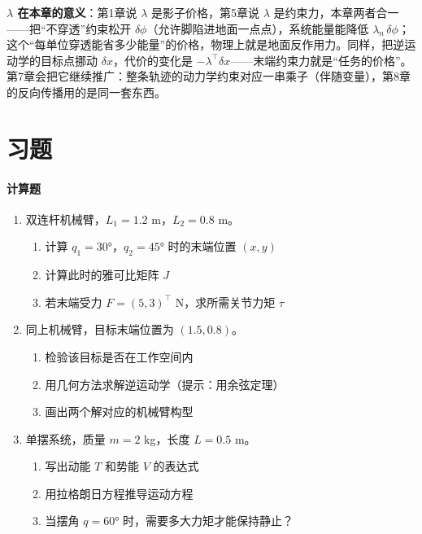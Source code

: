 \begin{physicalmeaning}
\textbf{$\lambda$ 在本章的意义}：第1章说 $\lambda$ 是影子价格，第5章说 $\lambda$ 是约束力，本章两者合一——把“不穿透”约束松开 $\delta\phi$（允许脚陷进地面一点点），系统能量能降低 $\lambda_n\,\delta\phi$；这个“每单位穿透能省多少能量”的价格，物理上就是地面反作用力。同样，把逆运动学的目标点挪动 $\delta x$，代价的变化是 $-\lambda^\top \delta x$——末端约束力就是“任务的价格”。第7章会把它继续推广：整条轨迹的动力学约束对应一串乘子（伴随变量），第8章的反向传播用的是同一套东西。
\end{physicalmeaning}

\section{习题}

\paragraph{计算题}
\begin{enumerate}
    \item 双连杆机械臂，$L_1 = 1.2$ m，$L_2 = 0.8$ m。
    \begin{enumerate}
        \item 计算 $q_1 = 30°$，$q_2 = 45°$ 时的末端位置 $(x, y)$
        \item 计算此时的雅可比矩阵 $J$
        \item 若末端受力 $F = (5, 3)^\top$ N，求所需关节力矩 $\tau$
    \end{enumerate}
    
    \item 同上机械臂，目标末端位置为 $(1.5, 0.8)$。
    \begin{enumerate}
        \item 检验该目标是否在工作空间内
        \item 用几何方法求解逆运动学（提示：用余弦定理）
        \item 画出两个解对应的机械臂构型
    \end{enumerate}
    
    \item 单摆系统，质量 $m = 2$ kg，长度 $L = 0.5$ m。
    \begin{enumerate}
        \item 写出动能 $T$ 和势能 $V$ 的表达式
        \item 用拉格朗日方程推导运动方程
        \item 当摆角 $q = 60°$ 时，需要多大力矩才能保持静止？
    \end{enumerate}
\end{enumerate}

